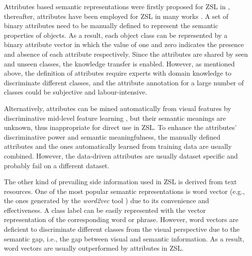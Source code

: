 \documentclass[runningheads,a4paper] {llncs}
\begin{document}
Attributes based semantic representations were firstly proposed for ZSL in \cite{lampert2009learning}, thereafter, attributes have been employed for ZSL in many works \cite{xian2017zero,zhang2016zero,chao2016empirical,wang2016zero}. A set of binary attributes need to be manually defined to represent the semantic properties of objects. As a result, each object class can be represented by a binary attribute vector in which the value of one and zero indicates the presence and absence of each attribute respectively. Since the attributes are shared by seen and unseen classes, the knowledge transfer is enabled. However, as mentioned above, the definition of attributes require experts with domain knowledge to discriminate different classes, and the attribute annotation for a large number of classes could be subjective and labour-intensive.

Alternatively, attributes can be mined automatically from visual features by discriminative mid-level feature learning \cite{farhadi2009describing,liu2011recognizing,sharmanska2012augmented,qin2016beyond,fu2014learning}, but their semantic meanings are unknown, thus inappropriate for direct use in ZSL. To enhance the attributes' discriminative power and semantic meaningfulness, the manually defined attributes and the ones automatically learned from training data are usually combined. However, the data-driven attributes are usually dataset specific and probably fail on a different dataset.

The other kind of prevailing side information used in ZSL is derived from text resources. One of the most popular semantic representations is word vector (e.g., the ones generated by the \textit{word2vec} tool \cite{mikolov2013distributed}) due to its convenience and effectiveness. A class label can be easily represented with the vector representation of the corresponding word or phrase. However, word vectors are deficient to discriminate different classes from the visual perspective due to the semantic gap, i.e., the gap between visual and semantic information. As a result, word vectors are usually outperformed by attributes in ZSL.
\end{document}
